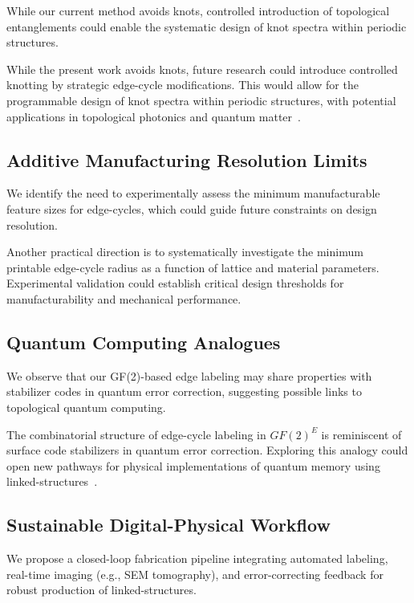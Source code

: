 \documentclass[times,twocolumn,final]{elsarticle}
\begin{document}
While our current method avoids knots, controlled introduction of topological entanglements could enable the systematic design of knot spectra within periodic structures.

While the present work avoids knots, future research could introduce controlled knotting by strategic edge-cycle modifications. This would allow for the programmable design of knot spectra within periodic structures, with potential applications in topological photonics and quantum matter~\cite{klug2024chainmail}.

\subsection{Additive Manufacturing Resolution Limits}

We identify the need to experimentally assess the minimum manufacturable feature sizes for edge-cycles, which could guide future constraints on design resolution.

Another practical direction is to systematically investigate the minimum printable edge-cycle radius as a function of lattice and material parameters. Experimental validation could establish critical design thresholds for manufacturability and mechanical performance.

\subsection{Quantum Computing Analogues}

We observe that our GF(2)-based edge labeling may share properties with stabilizer codes in quantum error correction, suggesting possible links to topological quantum computing.

The combinatorial structure of edge-cycle labeling in $GF(2)^E$ is reminiscent of surface code stabilizers in quantum error correction. Exploring this analogy could open new pathways for physical implementations of quantum memory using linked-structures~\cite{Chen2024deployable}.

\subsection{Sustainable Digital-Physical Workflow}

We propose a closed-loop fabrication pipeline integrating automated labeling, real-time imaging (e.g., SEM tomography), and error-correcting feedback for robust production of linked-structures.
\end{document}

